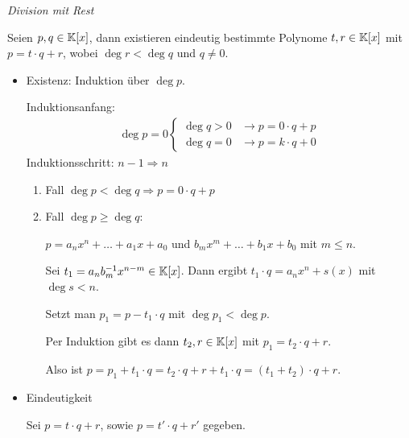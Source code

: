 \begin{mylemma}\label{divRestK[x]}\textit{Division mit Rest}\medskip

    Seien $p , q \in \mathbb{K}[x]$, dann existieren eindeutig bestimmte Polynome $t, r \in \mathbb{K}[x]$ mit $p = t \cdot q + r$, wobei $\deg r < \deg q$ und $q\neq0$.

    \begin{itemize}
        \item Existenz: Induktion über $\deg p$.

            Induktionsanfang:
            \begin{align*}
                \deg p = 0
                \begin{cases}
                    \deg q>0  & \rightarrow p=0\cdot q+p \\
                    \deg q=0  & \rightarrow p=k\cdot q+0
                \end{cases}
            \end{align*}
            Induktionsschritt: $n - 1 \Rightarrow n$
            \begin{enumerate}
                \item Fall $\deg p < \deg q \Rightarrow p = 0 \cdot q + p$
                \item Fall $\deg p \geq \deg q$:

                    $p = a_n x^n + \ldots + a_1 x + a_0$ und $b_m x^m + \ldots + b_1 x + b_0$ mit $m \leq n$.

                    Sei $t_1 = a_n b_m^{-1} x^{n-m} \in \mathbb{K}[x]$. Dann ergibt $t_1 \cdot q = a_n x^n + s(x)$ mit $\deg s<n$.

                    Setzt man $p_1 = p - t_1 \cdot q$ mit $\deg p_1 < \deg p$.

                    Per Induktion gibt es dann $t_2, r \in \mathbb{K}[x]$ mit $p_1 = t_2 \cdot q + r$.

                    Also ist $p = p_1 + t_1 \cdot q = t_2 \cdot q + r + t_1 \cdot q = (t_1 + t_2) \cdot q + r$.
            \end{enumerate}

        \item Eindeutigkeit

            Sei $p = t \cdot q + r$, sowie $p = t' \cdot q + r'$ gegeben.


\end{itemize}
\end{mylemma}
